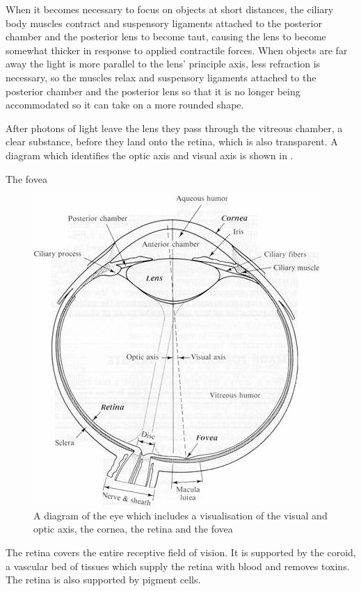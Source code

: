 When it becomes necessary to focus on objects at short distances, the
ciliary body muscles contract and suspensory ligaments attached to the
posterior chamber and the posterior lens to become taut, causing the
lens to become somewhat thicker in response to applied contractile
forces. When objects are far away the light is more parallel to the
lens' principle axis, less refraction is necessary, so the muscles
relax and suspensory ligaments attached to the posterior chamber and
the posterior lens so that it is no longer being accommodated so it
can take on a more rounded shape.

After photons of light leave the lens they pass through the vitreous
chamber, a clear substance, before they land onto the retina, which
is also transparent. A diagram which identifies the optic axis and
visual axis is shown in .

The fovea

\begin{figure}[htbp]
  \centering
    \includegraphics{figures/eye_diagram}
  \caption{A diagram of the eye which includes a visualisation of the visual
   and optic axis, the cornea, the retina and the fovea}
  \label{fig:optic_axis}
\end{figure}

The retina covers the entire receptive field of vision. It is supported by
the coroid, a vascular bed of tissues which supply the retina with blood and
removes toxins.\cite{} The retina is also supported by pigment cells.\cite{}

